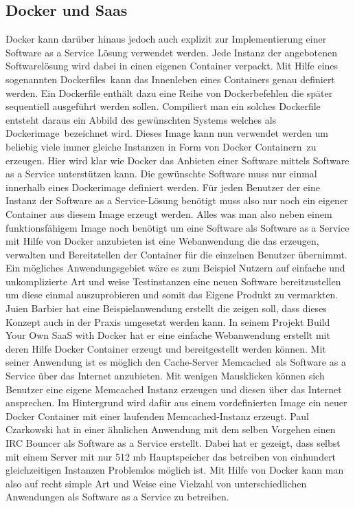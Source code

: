\subsection{Docker und Saas}
\label{sec:docker_und_saas}
Docker kann darüber hinaus jedoch auch explizit zur Implementierung einer Software as a Service Lösung verwendet werden. Jede Instanz der angebotenen Softwarelösung wird dabei in einen eigenen Container verpackt. Mit Hilfe eines sogenannten \grq Dockerfiles\grq\ kann das Innenleben eines Containers genau definiert werden. Ein Dockerfile enthält dazu eine Reihe von Dockerbefehlen die später sequentiell ausgeführt werden sollen. Compiliert man ein solches Dockerfile entsteht daraus ein Abbild des gewünschten Systems welches als \grq Dockerimage\grq\ bezeichnet wird.
Dieses Image kann nun verwendet werden um beliebig viele immer gleiche Instanzen in Form von \grq Docker Containern\grq\ zu erzeugen.
Hier wird klar wie Docker das Anbieten einer Software mittels Software as a Service unterstützen kann.
Die gewünschte Software muss nur einmal innerhalb eines Dockerimage definiert werden. Für jeden Benutzer der eine Instanz der Software as a Service-Lösung benötigt muss also nur noch ein eigener Container aus diesem Image erzeugt werden. Alles was man also neben einem funktionsfähigem Image noch benötigt um eine Software als Software as a Service mit Hilfe von Docker anzubieten ist eine Webanwendung die das erzeugen, verwalten und Bereitstellen der Container für die einzelnen Benutzer übernimmt.
Ein mögliches Anwendungsgebiet wäre es zum Beispiel Nutzern auf einfache und unkomplizierte Art und weise Testinstanzen eine neuen Software bereitzustellen um diese einmal auszuprobieren und somit das Eigene Produkt zu vermarkten.
Juien Barbier hat eine Beispielanwendung erstellt die zeigen soll, dass dieses Konzept auch in der Praxis umgesetzt werden kann.
In seinem Projekt \glqq Build Your Own SaaS with Docker\grqq \cite{barbier_build_2013} hat er eine einfache Webanwendung erstellt mit deren Hilfe Docker Container erzeugt und bereitgestellt werden können. Mit seiner Anwendung ist es möglich den Cache-Server \grq Memcached\grq\ als Software as a Service über das Internet anzubieten. Mit wenigen Mausklicken können sich Benutzer eine eigene Memcached Instanz erzeugen und diesen über das Internet ansprechen.
Im Hintergrund wird dafür aus einem vordefinierten Image ein neuer Docker Container mit einer laufenden Memcached-Instanz erzeugt.
Paul Czarkowski hat in einer ähnlichen Anwendung mit dem selben Vorgehen einen  IRC Bouncer als Software as a Service erstellt. Dabei hat er gezeigt, dass selbst mit einem Server mit nur 512 mb Hauptspeicher das betreiben von einhundert gleichzeitigen Instanzen Problemlos möglich ist. \cite{czarkowski_i_????}
Mit Hilfe von Docker kann man also auf recht simple Art und Weise eine Vielzahl von unterschiedlichen Anwendungen als Software as a Service zu betreiben.

